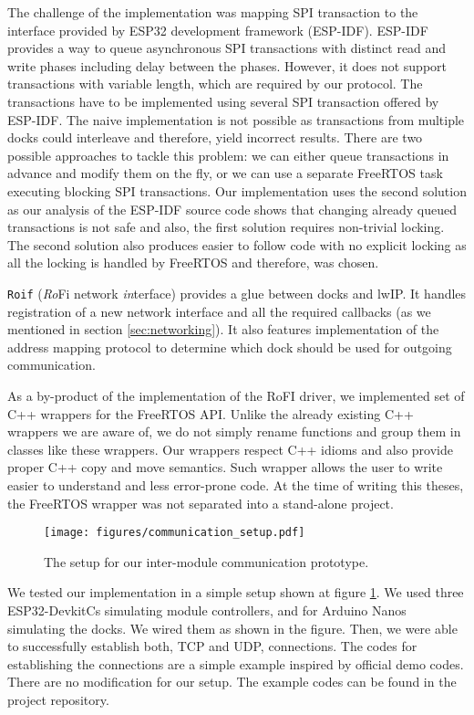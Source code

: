 The challenge of the implementation was mapping SPI transaction to the interface
provided by ESP32 development framework (ESP-IDF). ESP-IDF provides a way to
queue asynchronous SPI transactions with distinct read and write phases
including delay between the phases. However, it does not support transactions
with variable length, which are required by our protocol. The transactions have
to be implemented using several SPI transaction offered by ESP-IDF. The naive
implementation is not possible as transactions from multiple docks could
interleave and therefore, yield incorrect results. There are two possible
approaches to tackle this problem: we can either queue transactions in advance
and modify them on the fly, or we can use a separate FreeRTOS task executing
blocking SPI transactions. Our implementation uses the second solution as our
analysis of the ESP-IDF source code shows that changing already queued
transactions is not safe and also, the first solution requires non-trivial
locking. The second solution also produces easier to follow code with no
explicit locking as all the locking is handled by FreeRTOS and therefore, was
chosen.

\texttt{Roif} (\emph{Ro}Fi network \emph{in}terface) provides a glue between
docks and lwIP. It handles registration of a new network interface and all the
required callbacks (as we mentioned in section \ref{sec:networking}). It also
features implementation of the address mapping protocol to determine which dock
should be used for outgoing communication.

As a by-product of the implementation of the RoFI driver, we implemented set of
C++ wrappers for the FreeRTOS API. Unlike the already existing C++ wrappers we
are aware of, we do not simply rename functions and group them in classes like
these wrappers. Our wrappers respect C++ idioms and also provide proper C++ copy
and move semantics. Such wrapper allows the user to write easier to understand
and less error-prone code. At the time of writing this theses, the FreeRTOS
wrapper was not separated into a stand-alone project.

\begin{figure}[!t]
    \centering
    \texttt{[image: figures/communication\_setup.pdf]}
    \caption{The setup for our inter-module communication prototype.}
    \label{fig:comm_setup}
\end{figure}

We tested our implementation in a simple setup shown at figure
\ref{fig:comm_setup}. We used three ESP32-DevkitCs simulating module
controllers, and for Arduino Nanos simulating the docks. We wired them as shown
in the figure. Then, we were able to successfully establish both, TCP and UDP,
connections. The codes for establishing the connections are a simple example
inspired by official demo codes. There are no modification for our setup. The
example codes can be found in the project repository.

